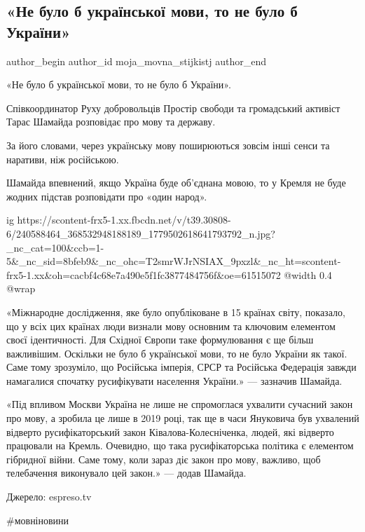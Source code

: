  
 
 
 
 
 
\subsection{«Не було б української мови, то не було б України»}
\label{sec:29_08_2021.fb.moja_movna_stijkistj.1.ukraina_mova}
 
\ifcmt
 author_begin
   author_id moja_movna_stijkistj
 author_end
\fi

«Не було б української мови, то не було б України». 

Співкоординатор Руху добровольців Простір свободи та громадський активіст Тарас
Шамайда розповідає про мову та державу.

За його словами, через українську мову поширюються зовсім інші сенси та
наративи, ніж російською.

Шамайда впевнений, якщо Україна буде об’єднана мовою, то у Кремля не буде
жодних підстав розповідати про «один народ».

\ifcmt
  ig https://scontent-frx5-1.xx.fbcdn.net/v/t39.30808-6/240588464_368532948188189_1779502618641793792_n.jpg?_nc_cat=100&ccb=1-5&_nc_sid=8bfeb9&_nc_ohc=T2smrWJrNSIAX_9pxzl&_nc_ht=scontent-frx5-1.xx&oh=cacbf4c68e7a490e5f1fc3877484756f&oe=61515072
  @width 0.4
  @wrap 
\fi

«Міжнародне дослідження, яке було опубліковане в 15 країнах світу, показало, що
у всіх цих країнах люди визнали мову основним та ключовим елементом своєї
ідентичності. Для Східної Європи таке формулювання є ще більш важливішим.
Оскільки не було б української мови, то не було України як такої. Саме тому
зрозуміло, що Російська імперія, СРСР та Російська Федерація завжди намагалися
спочатку русифікувати населення України.» — зазначив Шамайда.

«Під впливом Москви Україна не лише не спромоглася ухвалити сучасний закон про
мову, а зробила це лише в 2019 році, так ще в часи Януковича був ухвалений
відверто русифікаторський закон Ківалова-Колесніченка, людей, які відверто
працювали на Кремль. Очевидно, що така русифікаторська політика є елементом
гібридної війни. Саме тому, коли зараз діє закон про мову, важливо, щоб
телебачення виконувало цей закон.» — додав Шамайда.

Джерело: espreso.tv

\#мовніновини
